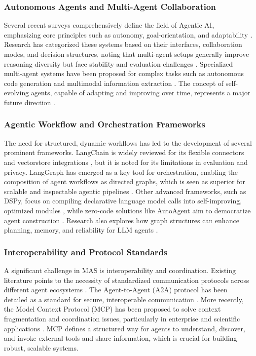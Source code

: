 \documentclass[lettersize,journal]{IEEEtran}
\begin{document}
\subsubsection{Autonomous Agents and Multi-Agent Collaboration}
Several recent surveys comprehensively define the field of Agentic AI, emphasizing core principles such as autonomy, goal-orientation, and adaptability \cite{acharya2025agentic, piccialli2025agentai, ali2025agentic}. Research has categorized these systems based on their interfaces, collaboration modes, and decision structures, noting that multi-agent setups generally improve reasoning diversity but face stability and evaluation challenges \cite{guo2024large}. Specialized multi-agent systems have been proposed for complex tasks such as autonomous code generation \cite{as2025multi, ramirez2024transforming} and multimodal information extraction \cite{odobesku2025agent}. The concept of self-evolving agents, capable of adapting and improving over time, represents a major future direction \cite{fang2025comprehensive}.

\subsubsection{Agentic Workflow and Orchestration Frameworks}
The need for structured, dynamic workflows has led to the development of several prominent frameworks. LangChain is widely reviewed for its flexible connectors and vectorstore integrations \cite{kotiyal2024chat}, but it is noted for its limitations in evaluation and privacy. LangGraph has emerged as a key tool for orchestration, enabling the composition of agent workflows as directed graphs, which is seen as superior for scalable and inspectable agentic pipelines \cite{wang2024agent, sapkota2025langchain}. Other advanced frameworks, such as DSPy, focus on compiling declarative language model calls into self-improving, optimized modules \cite{khattab2025dspy}, while zero-code solutions like AutoAgent aim to democratize agent construction \cite{tang2025autoagent}. Research also explores how graph structures can enhance planning, memory, and reliability for LLM agents \cite{liu2025graph}.

\subsubsection{Interoperability and Protocol Standards}
A significant challenge in MAS is interoperability and coordination. Existing literature points to the necessity of standardized communication protocols across different agent ecosystems \cite{sharma2025collaborative, derouiche2025agentic}. The Agent-to-Agent (A2A) protocol has been detailed as a standard for secure, interoperable communication \cite{ray2025review}. More recently, the Model Context Protocol (MCP) has been proposed to solve context fragmentation and coordination issues, particularly in enterprise and scientific applications \cite{krishnan2025advancing, ahn2025agentic}. MCP defines a structured way for agents to understand, discover, and invoke external tools and share information, which is crucial for building robust, scalable systems.
\end{document}
